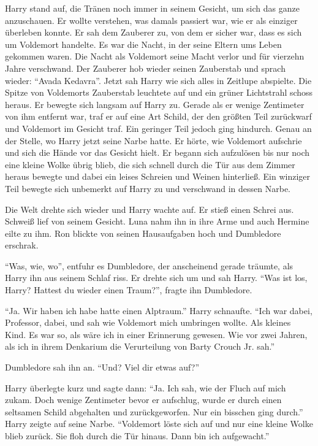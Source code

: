 Harry stand auf, die Tränen noch immer in seinem Gesicht, um sich das ganze anzuschauen. Er wollte verstehen, was damals passiert war, wie er als einziger überleben konnte. Er sah dem Zauberer zu, von dem er sicher war, dass es sich um Voldemort handelte. Es war die Nacht, in der seine Eltern ums Leben gekommen waren. Die Nacht als Voldemort seine Macht verlor und für vierzehn Jahre verschwand. Der Zauberer hob wieder seinen Zauberstab und sprach wieder: \enquote{Avada Kedavra}. Jetzt sah Harry wie sich alles in Zeitlupe abspielte. Die Spitze von Voldemorts Zauberstab leuchtete auf und ein grüner Lichtstrahl schoss heraus. Er bewegte sich langsam auf Harry zu. Gerade als er wenige Zentimeter von ihm entfernt war, traf er auf eine Art Schild, der den größten Teil zurückwarf und Voldemort im Gesicht traf. Ein geringer Teil jedoch ging hindurch. Genau an der Stelle, wo Harry jetzt seine Narbe hatte. Er hörte, wie Voldemort aufschrie und sich die Hände vor das Gesicht hielt. Er begann sich aufzulösen bis nur noch eine kleine Wolke übrig blieb, die sich schnell durch die Tür aus dem Zimmer heraus bewegte und dabei ein leises Schreien und Weinen hinterließ. Ein winziger Teil bewegte sich unbemerkt auf Harry zu und verschwand in dessen Narbe.

Die Welt drehte sich wieder und Harry wachte auf. Er stieß einen Schrei aus. Schweiß lief von seinem Gesicht. Luna nahm ihn in ihre Arme und auch Hermine eilte zu ihm. Ron blickte von seinen Hausaufgaben hoch und Dumbledore erschrak.

\enquote{Was, wie, wo}, entfuhr es Dumbledore, der anscheinend gerade träumte, als Harry ihn aus seinem Schlaf riss. Er drehte sich um und sah Harry. \enquote{Was ist los, Harry? Hattest du wieder einen Traum?}, fragte ihn Dumbledore.

\enquote{Ja. Wir haben \gst ich habe \gst hatte einen Alptraum.} Harry schnaufte. \enquote{Ich war dabei, Professor, dabei, und sah wie Voldemort mich umbringen wollte. Als kleines Kind. Es war so, als wäre ich in einer Erinnerung gewesen. Wie vor zwei Jahren, als ich in ihrem Denkarium die Verurteilung von Barty Crouch Jr. sah.}

Dumbledore sah ihn an. \enquote{Und? Viel dir etwas auf?}

Harry überlegte kurz und sagte dann: \enquote{Ja. Ich sah, wie der Fluch auf mich zukam. Doch wenige Zentimeter bevor er aufschlug, wurde er durch einen seltsamen Schild abgehalten und zurückgeworfen. Nur ein bisschen ging durch.} Harry zeigte auf seine Narbe. \enquote{Voldemort löste sich auf und nur eine kleine Wolke blieb zurück. Sie floh durch die Tür hinaus. Dann bin ich aufgewacht.}

